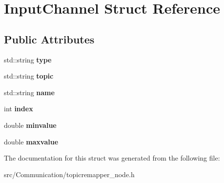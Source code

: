 \hypertarget{structInputChannel}{}\section{Input\+Channel Struct Reference}
\label{structInputChannel}
\subsection*{Public Attributes}
\begin{DoxyCompactItemize}
\item 
\mbox{\label{structInputChannel_aa9ecd22dc6177175d6cf38322939f933}} 
std\+::string {\bfseries type}
\item 
\mbox{\label{structInputChannel_a4bcf86ef6f6b7812ab4eb22b85625025}} 
std\+::string {\bfseries topic}
\item 
\mbox{\label{structInputChannel_ad7178715405fb1ee5df0956a53b2d2ad}} 
std\+::string {\bfseries name}
\item 
\mbox{\label{structInputChannel_a87fef13b45cdd51911cd9b3b880fc2e2}} 
int {\bfseries index}
\item 
\mbox{\label{structInputChannel_a0649cfca1ff836119a6c690c28ab7f49}} 
double {\bfseries minvalue}
\item 
\mbox{\label{structInputChannel_a2dfaf6da99782ad9fd3dddf1a93c7c95}} 
double {\bfseries maxvalue}
\end{DoxyCompactItemize}


The documentation for this struct was generated from the following file\+:\begin{DoxyCompactItemize}
\item 
src/\+Communication/topicremapper\+\_\+node.\+h\end{DoxyCompactItemize}
